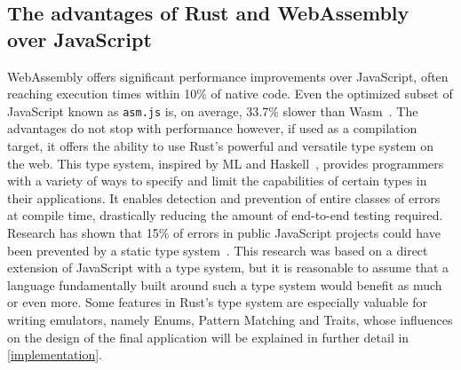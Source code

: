 \subsection{The advantages of Rust and WebAssembly over JavaScript}
WebAssembly offers significant performance improvements over JavaScript, often reaching execution times within 10\% of native code. Even the optimized subset of JavaScript known as \verb+asm.js+ is, on average, 33.7\% slower than Wasm~\cite[Chapter~7.3]{wasmspeed}. The advantages do not stop with performance however, if used as a compilation target, it offers the ability to use Rust's powerful and versatile type system on the web.
This type system, inspired by ML and Haskell~\cite{rustinfluences}, provides programmers with a variety of ways to specify and limit the capabilities of certain types in their applications.
It enables detection and prevention of entire classes of errors at compile time, drastically reducing the amount of end-to-end testing required. Research has shown that 15\% of errors in public JavaScript projects could have been prevented by a static type system~\cite{7985711}.
This research was based on a direct extension of JavaScript with a type system, but it is reasonable to assume that a language fundamentally built around such a type system would benefit as much or even more.
Some features in Rust's type system are especially valuable for writing emulators, namely Enums, Pattern Matching and Traits, whose influences on the design of the final application will be explained in further detail in \cref{implementation}.


